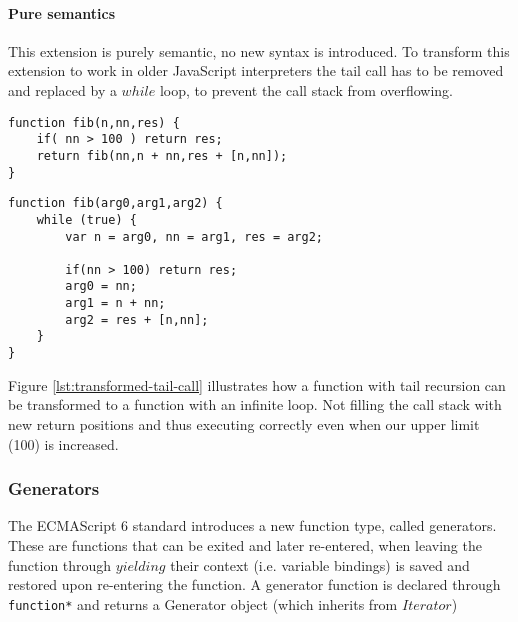 \documentclass[10pt,a4paper]{article}
\begin{document}
\paragraph{Pure semantics}
This extension is purely semantic, no new syntax is introduced. To transform this extension to work in older JavaScript interpreters the tail call has to be removed and replaced by a $while$ loop, to prevent the call stack from overflowing.

\begin{lstlisting}[caption={Function with tail recursion},label={lst:tail-call}]
function fib(n,nn,res) {
	if( nn > 100 ) return res;
	return fib(nn,n + nn,res + [n,nn]);
}
\end{lstlisting}

\begin{lstlisting}[caption={Semantically identical function, without tail recursion},label={lst:transformed-tail-call}]
function fib(arg0,arg1,arg2) {
	while (true) {
		var n = arg0, nn = arg1, res = arg2;

		if(nn > 100) return res;
		arg0 = nn;
		arg1 = n + nn;
		arg2 = res + [n,nn];
	}
}
\end{lstlisting}

Figure \ref{lst:transformed-tail-call} illustrates how a function with tail recursion can be transformed to a function with an infinite loop. Not filling the call stack with new return positions and thus executing correctly even when our upper limit (100) is increased.

\subsubsection{Generators}
The ECMAScript 6 standard introduces a new function type, called generators\cite[14.4]{SpecJS}. These are functions that can be exited and later re-entered, when leaving the function through $yielding$ their context (i.e. variable bindings) is saved and restored upon re-entering the function. A generator function is declared through \lstinline$function*$ and returns a Generator object (which inherits from $Iterator$)
\end{document}
